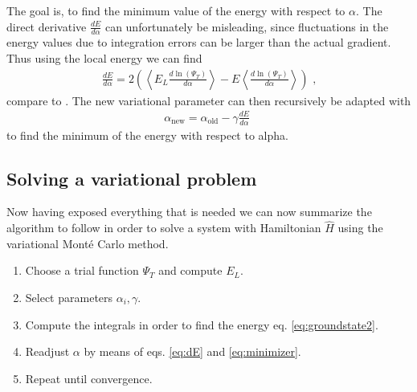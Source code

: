 The goal is, to find the minimum value of the energy with respect to $\alpha$. The direct derivative $\frac{dE}{d\alpha}$ can unfortunately be misleading, since fluctuations in the energy values due to integration errors can be larger than the actual gradient. Thus using the local energy
we can find
\begin{align}
\label{eq:dE}
\frac{dE}{d\alpha} = 2 \left( \left< E_L \frac{d \ln(\Psi_T)}{d \alpha} \right> - E\left<\frac{d \ln(\Psi_T)}{d \alpha}\right> \right) \text{~,}
\end{align}
compare to \cite{JosBook}.
The new variational parameter can then recursively be adapted with
\begin{align}
	\label{eq:minimizer}
	\alpha_{\text{new}} = \alpha_{\text{old}} - \gamma \frac{dE}{d\alpha} \text{~}
\end{align}
to find the minimum of the energy with respect to alpha.


\subsection{Solving a variational problem}
Now having exposed everything that is needed we
can now summarize the algorithm to follow in order to solve a system with Hamiltonian $\hat{H}$
using the variational Mont\'e Carlo method.
\begin{enumerate}
  \item Choose a trial function $\Psi_T$ and compute $E_L$.
  \item Select parameters $\alpha_i, \gamma$.
  \item Compute the integrals in order to find the energy eq. \ref{eq:groundstate2}.
  \item Readjust $\alpha$ by means of eqs. \ref{eq:dE} and \ref{eq:minimizer}.
  \item Repeat until convergence.
\end{enumerate}





